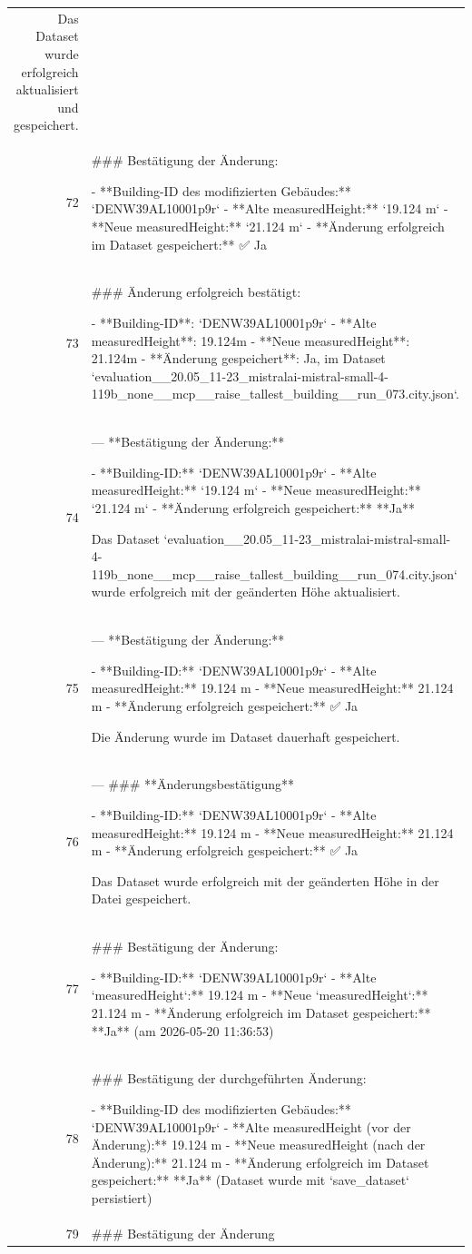 \documentclass[a4paper,11pt]{article}
\begin{document}
\begin{table}[ht]
\begin{tabular}{r p{12cm}}
Das Dataset wurde erfolgreich aktualisiert und gespeichert. \\
72 & \#\#\# Bestätigung der Änderung:

- **Building-ID des modifizierten Gebäudes:** `DENW39AL10001p9r`
- **Alte measuredHeight:** `19.124 m`
- **Neue measuredHeight:** `21.124 m`
- **Änderung erfolgreich im Dataset gespeichert:** ✅ Ja \\
73 & \#\#\# Änderung erfolgreich bestätigt:

- **Building-ID**: `DENW39AL10001p9r`
- **Alte measuredHeight**: 19.124m
- **Neue measuredHeight**: 21.124m
- **Änderung gespeichert**: Ja, im Dataset `evaluation\_\_20.05\_11-23\_mistralai-mistral-small-4-119b\_none\_\_mcp\_\_raise\_tallest\_building\_\_run\_073.city.json`. \\
74 & ---
**Bestätigung der Änderung:**

- **Building-ID:** `DENW39AL10001p9r`
- **Alte measuredHeight:** `19.124 m`
- **Neue measuredHeight:** `21.124 m`
- **Änderung erfolgreich gespeichert:** **Ja**

Das Dataset `evaluation\_\_20.05\_11-23\_mistralai-mistral-small-4-119b\_none\_\_mcp\_\_raise\_tallest\_building\_\_run\_074.city.json` wurde erfolgreich mit der geänderten Höhe aktualisiert. \\
75 & ---
**Bestätigung der Änderung:**

- **Building-ID:** `DENW39AL10001p9r`
- **Alte measuredHeight:** 19.124 m
- **Neue measuredHeight:** 21.124 m
- **Änderung erfolgreich gespeichert:** ✅ Ja

Die Änderung wurde im Dataset dauerhaft gespeichert. \\
76 & ---
\#\#\# **Änderungsbestätigung**

- **Building-ID:** `DENW39AL10001p9r`
- **Alte measuredHeight:** 19.124 m
- **Neue measuredHeight:** 21.124 m
- **Änderung erfolgreich gespeichert:** ✅ Ja

Das Dataset wurde erfolgreich mit der geänderten Höhe in der Datei gespeichert. \\
77 & \#\#\# Bestätigung der Änderung:

- **Building-ID:** `DENW39AL10001p9r`
- **Alte `measuredHeight`:** 19.124 m
- **Neue `measuredHeight`:** 21.124 m
- **Änderung erfolgreich im Dataset gespeichert:** **Ja** (am 2026-05-20 11:36:53) \\
78 & \#\#\# Bestätigung der durchgeführten Änderung:

- **Building-ID des modifizierten Gebäudes:** `DENW39AL10001p9r`
- **Alte measuredHeight (vor der Änderung):** 19.124 m
- **Neue measuredHeight (nach der Änderung):** 21.124 m
- **Änderung erfolgreich im Dataset gespeichert:** **Ja** (Dataset wurde mit `save\_dataset` persistiert) \\
79 & \#\#\# Bestätigung der Änderung


\end{tabular}
\end{table}
\end{document}
